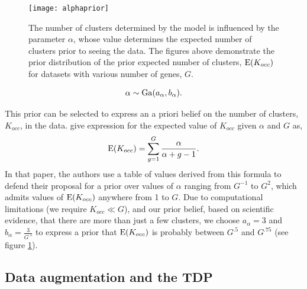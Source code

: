 {\begin{figure}
\texttt{[image: alphaprior]}
\caption{\small The number of clusters determined by the model is influenced by the parameter $\alpha$, whose value determines the expected number of clusters prior to seeing the data. The figures above demonstrate the prior distribution of the prior expected number of clusters, $\operatorname{E}(K_{occ})$ for datasets with various number of genes, $G$.}
\label{alphaprior}
\end{figure}

\begin{equation}
\alpha \sim \operatorname{Ga}(a_\alpha,b_\alpha).
\end{equation}

This prior can be selected to express an a priori belief on the number of clusters, $K_{occ}$, in the data. \citet{escobar1994} give expression for the expected value of $K_{occ}$ given $\alpha$ and $G$ as,
\begin{equation}
\operatorname{E}(K_{occ})=\sum_{g=1}^{G} \frac{\alpha}{\alpha + g - 1}.
\end{equation}
In that paper, the authors use a table of values derived from this formula to defend their proposal for a prior over values of $\alpha$ ranging from $G^{-1}$ to $G^{2}$, which admits values of $\operatorname{E}(K_{occ})$ anywhere from 1 to $G$. Due to computational limitations (we require $K_{occ} \ll G$), and our prior belief, based on scientific evidence, that there are more than just a few clusters, we choose $a_\alpha=3$ and $b_\alpha=\frac{3}{G^{.5}}$ to express a prior that $\operatorname{E}(K_{occ})$ is probably between $G^{.5}$ and $G^{.75}$ (see figure \ref{alphaprior}).

\subsection{Data augmentation and the TDP}
\label{subsec:reparam}

}
